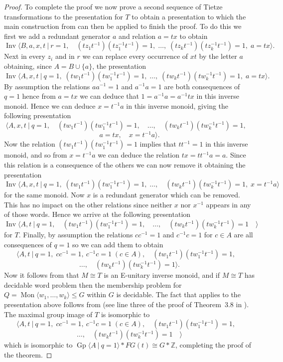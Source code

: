 \documentclass{amsart}
\newcommand{\Mgen}[1]{\operatorname{Mon}\bigl\langle #1 \bigr\rangle}
\newcommand{\Gpres}[2]{\operatorname{Gp}\bigl\langle #1\:|\:#2 \bigr\rangle}
\newcommand{\Ipres}[2]{\operatorname{Inv}\bigl\langle #1\:|\:#2 \bigr\rangle}
\theoremstyle{plain}
\theoremstyle{definition}
\begin{document}
\begin{proof}
To complete the proof we now prove a second sequence of Tietze transformations to the presentation for $T$ to obtain a presentation to which the main construction from \cite{gray2020undecidability} can then be applied to finish the proof. 
To do this we first we add a redundant generator $a$ and relation $a=tx$ to obtain    
\[
\Ipres{B,a,x,t}{
r= 1, \quad 
(t z_1 t^{-1}) (t z_1^{-1} t^{-1}) = 1, \;
\ldots, \;  
(t z_k t^{-1}) (t z_k^{-1} t^{-1}) = 1, \;
a=tx
}. 
\]
Next in every $z_i$ and in $r$ we can replace every occurrence of $xt$ by the letter $a$ obtaining, since $A = B \cup \{a\}$, the presentation     
\[
\Ipres{A,x,t}{
q= 1, \; 
(t w_1 t^{-1}) (t w_1^{-1} t^{-1}) = 1, \; 
\ldots, \; 
(t w_k t^{-1}) (t w_k^{-1} t^{-1}) = 1, \;
a=tx
}. 
\]
By assumption the relations $aa^{-1}=1$ and $a^{-1}a=1$ are both consequences of $q=1$ hence from $a=tx$ we can deduce that $1 = a^{-1}a = a^{-1}tx$ in this inverse monoid. Hence we can deduce $x = t^{-1}a$ in this inverse monoid, giving the following presentation      
\[
\bigl\langle A,x,t 
\:|\: 
q= 1, \quad 
(t w_1 t^{-1}) (t w_1^{-1} t^{-1}) = 1, \quad 
\ldots, \quad  
(t w_k t^{-1}) (t w_k^{-1} t^{-1}) = 1, \quad
\]
\[
a=tx, \quad 
x = t^{-1}a
\bigr\rangle.
\]
Now the relation 
$(t w_1 t^{-1}) (t w_1^{-1} t^{-1}) = 1$ implies that $tt^{-1}=1$ in this inverse monoid, and so from $x = t^{-1}a$ we can deduce the relation $tx = tt^{-1}a = a$. Since this relation is a consequence of the others we can now remove it obtaining the presentation   
 \[
\Ipres{A,x,t}{
q= 1, \; 
(t w_1 t^{-1}) (t w_1^{-1} t^{-1}) = 1, \; 
\ldots, \quad  
(t w_k t^{-1}) (t w_k^{-1} t^{-1}) = 1, \;
x = t^{-1}a
}
\]
for the same monoid. Now $x$ is a redundant generator which can be removed. This has no impact on the other relations since neither $x$ nor $x^{-1}$ appears in any of those words. Hence we arrive at the following presentation  
\[
\Ipres{A,t}{
q= 1, \quad 
(t w_1 t^{-1}) (t w_1^{-1} t^{-1}) = 1, \quad 
\ldots, \quad  
(t w_k t^{-1}) (t w_k^{-1} t^{-1}) = 1 \quad
}
\]
for $T$. Finally, by assumption the relations $cc^{-1}=1$ and $c^{-1}c=1$ for $c \in A$ are all consequences of $q=1$ so we can add them to obtain      
\[
\bigl\langle  
A,t
\:|\: 
q= 1, \; 
cc^{-1}=1, \ c^{-1}c=1 \; (c \in A), \quad 
(t w_1 t^{-1}) (t w_1^{-1} t^{-1}) = 1, \quad 
\]
\[
\ldots, \quad  
(t w_k t^{-1}) (t w_k^{-1} t^{-1}) = 1 
\bigl\rangle. 
\]
Now it follows from \cite[Theorem~3.8]{gray2020undecidability} that $M \cong T$ is an E-unitary inverse monoid, and 
if $M \cong T$ has decidable word problem then the membership problem for $Q = \Mgen{w_1, \ldots, w_k} \leq G$ within $G$ is decidable.
The fact that \cite[Theorem~3.8]{gray2020undecidability} applies to the presentation above follows from \cite[Lemma~3.3]{gray2020undecidability} (see line three of the proof of Theorem~3.8 in \cite{gray2020undecidability}). 
The maximal group image of $T$ is isomorphic to   
\[
\bigl\langle  
A,t
\:|\: 
q= 1, \; 
cc^{-1}=1, \ c^{-1}c=1 \; (c \in A), \quad 
(t w_1 t^{-1}) (t w_1^{-1} t^{-1}) = 1, \quad 
\]
\[
\ldots, \quad  
(t w_k t^{-1}) (t w_k^{-1} t^{-1}) = 1 \quad
\bigl\rangle  
\]
which is isomorphic to $\Gpres{A}{q=1} \ast FG(t) \cong G \ast \mathbb{Z}$, completing the proof of the theorem. 
\end{proof}
\end{document}
